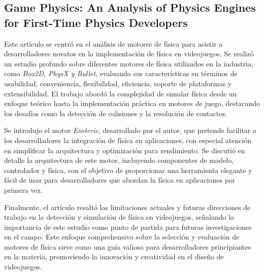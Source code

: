 \subsection{Game Physics: An Analysis of Physics Engines for First-Time Physics Developers}\cite{templet2020}
Este artículo se centró en el análisis de motores de física para asistir a desarrolladores novatos en la implementación de física en videojuegos. Se realizó un estudio profundo sobre diferentes motores de física utilizados en la industria, como \textit{Box2D, PhysX y Bullet}, evaluando sus características en términos de usabilidad, conveniencia, flexibilidad, eficiencia, soporte de plataformas y extensibilidad. El trabajo abordó la complejidad de simular física desde un enfoque teórico hasta la implementación práctica en motores de juego, destacando los desafíos como la detección de colisiones y la resolución de contactos.

Se introdujo el motor \textit{Esoteric}, desarrollado por el autor, que pretende facilitar a los desarrolladores la integración de física en aplicaciones, con especial atención en simplificar la arquitectura y optimización para rendimiento. Se discutió en detalle la arquitectura de este motor, incluyendo componentes de modelo, controlador y física, con el objetivo de proporcionar una herramienta elegante y fácil de usar para desarrolladores que abordan la física en aplicaciones por primera vez.

Finalmente, el artículo resaltó las limitaciones actuales y futuras direcciones de trabajo en la detección y simulación de física en videojuegos, señalando la importancia de este estudio como punto de partida para futuras investigaciones en el campo. Este enfoque comprehensivo sobre la selección y evaluación de motores de física sirve como una guía valiosa para desarrolladores principiantes en la materia, promoviendo la innovación y creatividad en el diseño de videojuegos.